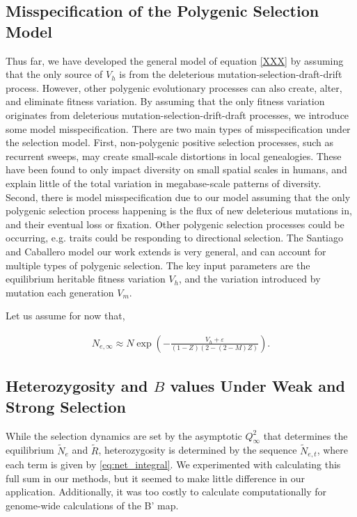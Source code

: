\documentclass[11pt]{article}
\begin{document}
\subsection*{Misspecification of the Polygenic Selection Model}

Thus far, we have developed the general model of equation \eqref{XXX} by
assuming that the only source of $V_h$ is from the deleterious
mutation-selection-draft-drift process. However, other polygenic evolutionary
processes can also create, alter, and eliminate fitness variation. By assuming
that the only fitness variation originates from deleterious
mutation-selection-drift-draft processes, we introduce some model
misspecification. There are two main types of misspecification under the
selection model. First, non-polygenic positive selection processes, such as
recurrent sweeps, may create small-scale distortions in local genealogies.
These have been found to only impact diversity on small spatial scales
\parencite{Murphy2022-sj} in humans, and explain little of the total variation
in megabase-scale patterns of diversity. Second, there is model
misspecification due to our model assuming that the only polygenic selection
process happening is the flux of new deleterious mutations in, and their
eventual loss or fixation. Other polygenic selection processes could be
occurring, e.g. traits could be responding to directional selection. The
Santiago and Caballero model our work extends is very general, and can account
for multiple types of polygenic selection. The key input parameters are the
equilibrium heritable fitness variation $V_h$, and the variation introduced by
mutation each generation $V_m$. 

Let us assume for now that,

\begin{align}
  \label{eq:Ne_inf}
  N_{e,\infty} \approx N \exp\left(-\frac{V_h + \varepsilon}{(1-Z) (2-(2-M) Z)} \right).
\end{align}

\subsection*{Heterozygosity and $B$ values Under Weak and Strong Selection}

While the selection dynamics are set by the asymptotic $Q_\infty^2$ that
determines the equilibrium $\widetilde{N}_e$ and $\widetilde{R}$,
heterozygosity is determined by the sequence $\widetilde{N}_{e,t}$, where each
term is given by \eqref{eq:net_integral}. We experimented with calculating this
full sum in our methods, but it seemed to make little difference in our
application. Additionally, it was too costly to calculate computationally
for genome-wide calculations of the B' map.
\end{document}
